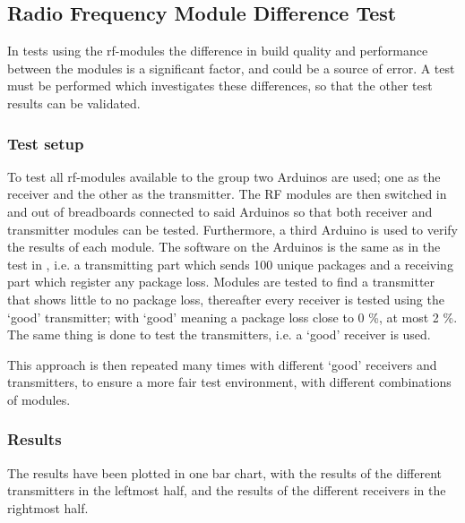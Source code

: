 \subsection{Radio Frequency Module Difference Test} %
\label{cha:radio_frequency_module_difference_test}
In tests using the \gls{rf}-modules the difference in build quality and performance between the modules is a significant factor, and could be a source of error.
A test must be performed which investigates these differences, so that the other test results can be validated.

\subsubsection*{Test setup}
To test all \gls{rf}-modules available to the group two Arduinos are used; one as the receiver and the other as the transmitter.
The RF modules are then switched in and out of breadboards connected to said Arduinos so that both receiver and transmitter modules can be tested.
Furthermore, a third Arduino is used to verify the results of each module.
The software on the Arduinos is the same as in the test in , i.e. a transmitting part which sends 100 unique packages and a receiving part which register any package loss. 
Modules are tested to find a transmitter that shows little to no package loss, thereafter every receiver is tested using the \enquote*{good} transmitter; with \enquote*{good} meaning a package loss close to 0 \%, at most 2 \%.
The same thing is done to test the transmitters, i.e. a \enquote*{good} receiver is used.

This approach is then repeated many times with different \enquote*{good} receivers and transmitters, to ensure a more fair test environment, with different combinations of modules.

\subsubsection*{Results}
The results have been plotted in one bar chart, with the results of the different transmitters in the leftmost half, and the results of the different receivers in the rightmost half.

